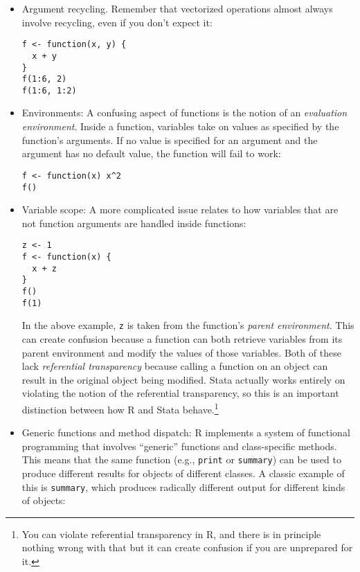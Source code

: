 \documentclass[a4paper,12pt]{article}
\begin{document}
\begin{itemize}

\item Argument recycling. Remember that vectorized operations almost always involve recycling, even if you don't expect it:

\begin{lstlisting}
f <- function(x, y) {
  x + y
}
f(1:6, 2)
f(1:6, 1:2)
\end{lstlisting}

\item Environments: A confusing aspect of functions is the notion of an \textit{evaluation environment}. Inside a function, variables take on values as specified by the function's arguments. If no value is specified for an argument and the argument has no default value, the function will fail to work:

\begin{lstlisting}
f <- function(x) x^2
f()
\end{lstlisting}

\item Variable scope: A more complicated issue relates to how variables that are not function arguments are handled inside functions:

\begin{lstlisting}
z <- 1
f <- function(x) {
  x + z
}
f()
f(1)
\end{lstlisting}

In the above example, \texttt{z} is taken from the function's \textit{parent environment}. This can create confusion because a function can both retrieve variables from its parent environment and modify the values of those variables. Both of these lack \textit{referential transparency} because calling a function on an object can result in the original object being modified. Stata actually works entirely on violating the notion of the referential transparency, so this is an important distinction between how R and Stata behave.\footnote{You can violate referential transparency in R, and there is in principle nothing wrong with that but it can create confusion if you are unprepared for it.}

\item Generic functions and method dispatch: R implements a system of functional programming that involves ``generic'' functions and class-specific methods. This means that the same function (e.g., \texttt{print} or \texttt{summary}) can be used to produce different results for objects of different classes. A classic example of this is \texttt{summary}, which produces radically different output for different kinds of objects:


\end{itemize}
\end{document}
